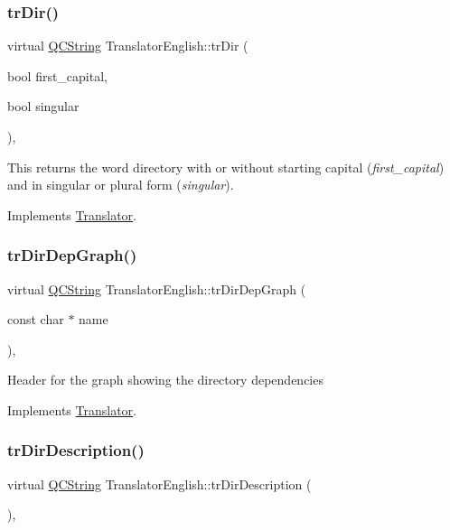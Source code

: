 \subsubsection{\texorpdfstring{trDir()}{trDir()}}
{\footnotesize\ttfamily virtual \mbox{\hyperlink{class_q_c_string}{Q\+C\+String}} Translator\+English\+::tr\+Dir (\begin{DoxyParamCaption}\item[{bool}]{first\+\_\+capital,  }\item[{bool}]{singular }\end{DoxyParamCaption})\hspace{0.3cm}{\ttfamily [inline]}, {\ttfamily [virtual]}}

This returns the word directory with or without starting capital ({\itshape first\+\_\+capital}) and in singular or plural form ({\itshape singular}). 

Implements \mbox{\hyperlink{class_translator}{Translator}}.

\mbox{\label{class_translator_english_a39173a615f00127b526058796a4ac6f2}} 
\subsubsection{\texorpdfstring{trDirDepGraph()}{trDirDepGraph()}}
{\footnotesize\ttfamily virtual \mbox{\hyperlink{class_q_c_string}{Q\+C\+String}} Translator\+English\+::tr\+Dir\+Dep\+Graph (\begin{DoxyParamCaption}\item[{const char $\ast$}]{name }\end{DoxyParamCaption})\hspace{0.3cm}{\ttfamily [inline]}, {\ttfamily [virtual]}}

Header for the graph showing the directory dependencies 

Implements \mbox{\hyperlink{class_translator}{Translator}}.

\mbox{\label{class_translator_english_a1fbfd38427dbf04dcf8368939fb8b3b3}} 
\subsubsection{\texorpdfstring{trDirDescription()}{trDirDescription()}}
{\footnotesize\ttfamily virtual \mbox{\hyperlink{class_q_c_string}{Q\+C\+String}} Translator\+English\+::tr\+Dir\+Description (\begin{DoxyParamCaption}{ }\end{DoxyParamCaption})\hspace{0.3cm}{\ttfamily [inline]}, {\ttfamily [virtual]}}

